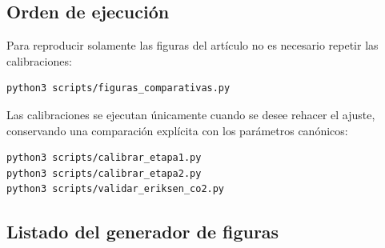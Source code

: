 \subsection{Orden de ejecución}

Para reproducir solamente las figuras del artículo no es necesario
repetir las calibraciones:
\begin{verbatim}
python3 scripts/figuras_comparativas.py
\end{verbatim}

Las calibraciones se ejecutan únicamente cuando se desee rehacer el
ajuste, conservando una comparación explícita con los parámetros
canónicos:
\begin{verbatim}
python3 scripts/calibrar_etapa1.py
python3 scripts/calibrar_etapa2.py
python3 scripts/validar_eriksen_co2.py
\end{verbatim}

\subsection{Listado del generador de figuras}



